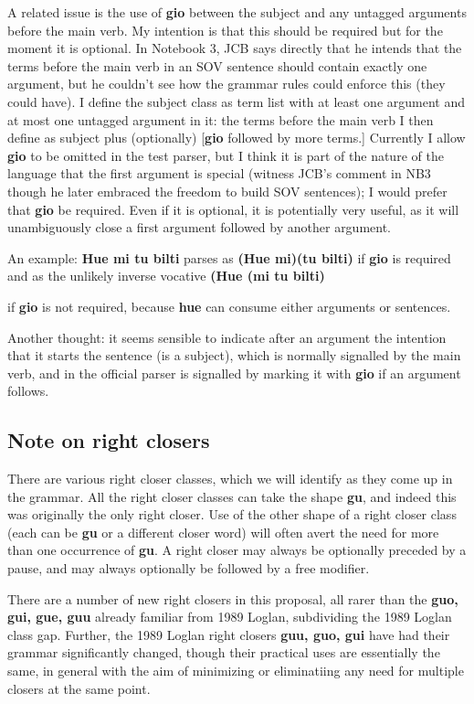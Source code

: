 \documentclass[12pt]{book}
\begin{document}
{A related issue is the use of {\bf gio} between the subject and any untagged arguments before the main verb.  My intention is that this should be required but for the moment it is optional.  In Notebook 3, JCB says directly that he intends that the terms before the main verb in an SOV sentence should contain exactly one argument, but he couldn't see how the grammar rules could enforce this (they could have).  I define the subject class as term list with at least one argument and at most one untagged argument in it:  the terms before the main verb I then define as subject plus (optionally) [{\bf gio} followed by more terms.]  Currently I allow {\bf gio} to be omitted in the test parser, but I think it is part of the nature of the language that the first argument is special (witness JCB's comment in NB3 though he later embraced the freedom to build SOV sentences);  I would prefer that {\bf gio} be required.  Even if it is optional, it is potentially very useful, as it will unambiguously close a first argument followed by another argument.

An example:  {\bf Hue mi tu bilti} parses as {\bf (Hue mi)(tu bilti)} if {\bf gio} is required and as the unlikely inverse vocative 
\bf (Hue (mi tu bilti)} if {\bf gio} is not required, because {\bf hue} can consume either arguments or sentences.

Another thought:  it seems sensible to indicate after an argument the intention that it starts the sentence (is a subject), which is normally signalled by the main verb, and in the official parser is signalled by marking it with {\bf gio} if an argument follows.


\subsection{Note on right closers}

There are various right closer classes, which we will identify as they come up in the grammar.  All the right closer classes can take the shape
{\bf gu}, and indeed this was originally the only right closer.  Use of the other shape of a right closer class (each can be {\bf gu} or a different closer word)  will often avert the need for
more than one occurrence of {\bf gu}.  A right closer may always be optionally preceded by a pause, and may always optionally be followed by a free modifier.

There are a number of new right closers in this proposal, all rarer than the {\bf guo, gui, gue, guu} already familiar from 1989 Loglan, subdividing the 1989 Loglan class gap.
Further, the 1989 Loglan right closers {\bf guu, guo, gui} have had their grammar significantly changed, though their practical uses are essentially the same, in general with the aim
of minimizing or eliminatiing any need for multiple closers at the same point.
\end{document}
